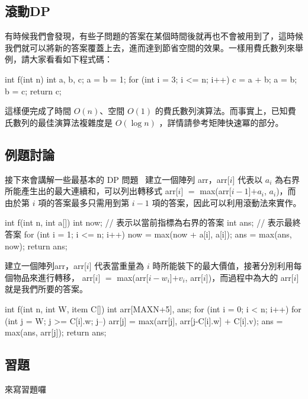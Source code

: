 \subsection{滾動DP} 
有時候我們會發現，有些子問題的答案在某個時間後就再也不會被用到了，這時候我們就可以將新的答案覆蓋上去，進而達到節省空間的效果。一樣用費氏數列來舉例，請大家看看如下程式碼：
\begin{C++}
	int f(int n) {
		int a, b, c;
		a = b = 1;
		for (int i = 3; i <= n; i++) {
			c = a + b;
			a = b;
			b = c;
		}
		return c;
	}
\end{C++}
這樣便完成了時間 $O(n)$、空間 $O(1)$ 的費氏數列演算法。而事實上，已知費氏數列的最佳演算法複雜度是 $O(\log n)$ ，詳情請參考矩陣快速冪的部分。

\subsection{例題討論} 
接下來會講解一些最基本的 DP 問題~
建立一個陣列 arr，arr[$i$] 代表以 $a_i$ 為右界所能產生出的最大連續和，可以列出轉移式 arr[$i$] $=$ max(arr[$i-1$]$+ a_i$, $a_i$)，而由於第 $i$ 項的答案最多只需用到第 $i-1$ 項的答案，因此可以利用滾動法來實作。
\begin{C++}
	int f(int n, int a[]) {
		int now; // 表示以當前指標為右界的答案
		int ans; // 表示最終答案
		for (int i = 1; i <= n; i++) {
			now = max(now + a[i], a[i]);
			ans = max(ans, now);
		}
		return ans;
	}
\end{C++}

建立一個陣列arr，arr[$i$] 代表當重量為 $i$ 時所能裝下的最大價值，接著分別利用每個物品來進行轉移，  arr[$i$] $=$ max(arr[$i-w_i$]$+ v_i$, arr[$i$])，而過程中為大的 arr[$i$] 就是我們所要的答案。
\begin{C++}
	int f(int n, int W, item C[]) {
		int arr[MAXN+5], ans;
		for (int i = 0; i < n; i++) {
			for (int j = W; j >= C[i].w; j--) {
				arr[j] = max(arr[j], arr[j-C[i].w] + C[i].v);
				ans = max(ans, arr[j]);
			}
		}
		return ans;
	}
\end{C++}
\subsection{習題} 
來寫習題囉

